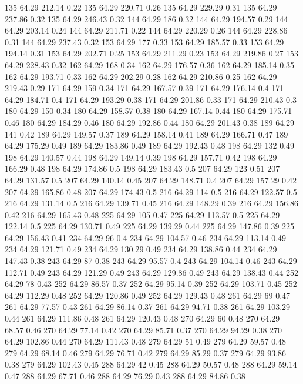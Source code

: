 135	64.29	212.14	0.22
135	64.29	220.71	0.26
135	64.29	229.29	0.31
135	64.29	237.86	0.32
135	64.29	246.43	0.32
144	64.29	186	0.32
144	64.29	194.57	0.29
144	64.29	203.14	0.24
144	64.29	211.71	0.22
144	64.29	220.29	0.26
144	64.29	228.86	0.31
144	64.29	237.43	0.32
153	64.29	177	0.33
153	64.29	185.57	0.33
153	64.29	194.14	0.31
153	64.29	202.71	0.25
153	64.29	211.29	0.23
153	64.29	219.86	0.27
153	64.29	228.43	0.32
162	64.29	168	0.34
162	64.29	176.57	0.36
162	64.29	185.14	0.35
162	64.29	193.71	0.33
162	64.29	202.29	0.28
162	64.29	210.86	0.25
162	64.29	219.43	0.29
171	64.29	159	0.34
171	64.29	167.57	0.39
171	64.29	176.14	0.4
171	64.29	184.71	0.4
171	64.29	193.29	0.38
171	64.29	201.86	0.33
171	64.29	210.43	0.3
180	64.29	150	0.34
180	64.29	158.57	0.38
180	64.29	167.14	0.44
180	64.29	175.71	0.46
180	64.29	184.29	0.46
180	64.29	192.86	0.44
180	64.29	201.43	0.38
189	64.29	141	0.42
189	64.29	149.57	0.37
189	64.29	158.14	0.41
189	64.29	166.71	0.47
189	64.29	175.29	0.49
189	64.29	183.86	0.49
189	64.29	192.43	0.48
198	64.29	132	0.49
198	64.29	140.57	0.44
198	64.29	149.14	0.39
198	64.29	157.71	0.42
198	64.29	166.29	0.48
198	64.29	174.86	0.5
198	64.29	183.43	0.5
207	64.29	123	0.51
207	64.29	131.57	0.5
207	64.29	140.14	0.45
207	64.29	148.71	0.4
207	64.29	157.29	0.42
207	64.29	165.86	0.48
207	64.29	174.43	0.5
216	64.29	114	0.5
216	64.29	122.57	0.5
216	64.29	131.14	0.5
216	64.29	139.71	0.45
216	64.29	148.29	0.39
216	64.29	156.86	0.42
216	64.29	165.43	0.48
225	64.29	105	0.47
225	64.29	113.57	0.5
225	64.29	122.14	0.5
225	64.29	130.71	0.49
225	64.29	139.29	0.44
225	64.29	147.86	0.39
225	64.29	156.43	0.41
234	64.29	96	0.4
234	64.29	104.57	0.46
234	64.29	113.14	0.49
234	64.29	121.71	0.49
234	64.29	130.29	0.49
234	64.29	138.86	0.44
234	64.29	147.43	0.38
243	64.29	87	0.38
243	64.29	95.57	0.4
243	64.29	104.14	0.46
243	64.29	112.71	0.49
243	64.29	121.29	0.49
243	64.29	129.86	0.49
243	64.29	138.43	0.44
252	64.29	78	0.43
252	64.29	86.57	0.37
252	64.29	95.14	0.39
252	64.29	103.71	0.45
252	64.29	112.29	0.48
252	64.29	120.86	0.49
252	64.29	129.43	0.48
261	64.29	69	0.47
261	64.29	77.57	0.43
261	64.29	86.14	0.37
261	64.29	94.71	0.38
261	64.29	103.29	0.44
261	64.29	111.86	0.48
261	64.29	120.43	0.48
270	64.29	60	0.48
270	64.29	68.57	0.46
270	64.29	77.14	0.42
270	64.29	85.71	0.37
270	64.29	94.29	0.38
270	64.29	102.86	0.44
270	64.29	111.43	0.48
279	64.29	51	0.49
279	64.29	59.57	0.48
279	64.29	68.14	0.46
279	64.29	76.71	0.42
279	64.29	85.29	0.37
279	64.29	93.86	0.38
279	64.29	102.43	0.45
288	64.29	42	0.45
288	64.29	50.57	0.48
288	64.29	59.14	0.47
288	64.29	67.71	0.46
288	64.29	76.29	0.43
288	64.29	84.86	0.38
